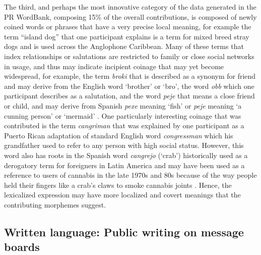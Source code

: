 \documentclass[output=paper,colorlinks,citecolor=brown]{langscibook}
\begin{document}
The third, and perhaps the most innovative category of the data generated in the PR WordBank, composing 15\% of the overall contributions, is composed of newly coined words or phrases that have a very precise local meaning, for example the term “island dog” that one participant explains is a term for mixed breed stray dogs and is used across the Anglophone Caribbean. Many of these terms that index relationships or salutations are restricted to family or close social networks in usage, and thus may indicate incipient coinage that may yet become widespread, for example, the term \emph{broki} that is described as a synonym for friend and may derive from the English word ‘brother’ or ‘bro’, the word \emph{obb} which one participant describes as a salutation, and the word \emph{peje} that means a close friend or child, and may derive from Spanish \emph{pexe} meaning ‘fish’ or \emph{peje} meaning ‘a cunning person’ or ‘mermaid’ \citep[329]{Roberts_2014}. One particularly interesting coinage that was contributed is the term \emph{cangriman} that was explained by one participant as a Puerto Rican adaptation of standard English word \emph{congressman} which his grandfather used to refer to any person with high social status. However, this word also has roots in the Spanish word \emph{cangrejo} (‘crab’) historically used as a derogatory term for foreigners in Latin America and may have been used as a reference to users of cannabis in the late 1970s and 80s because of the way people held their fingers like a crab’s claws to smoke cannabis joints \citep{UrbanDictionary_2007}. Hence, the lexicalized expression may have more localized and covert meanings that the contributing morphemes suggest. 

\subsection{Written language: Public writing on message boards}
\end{document}
